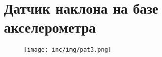 \chapter{Датчик наклона на базе акселерометра}
\label{cha:appendix3}

\begin{figure}
\centering
\texttt{[image: inc/img/pat3.png]}
\end{figure}

